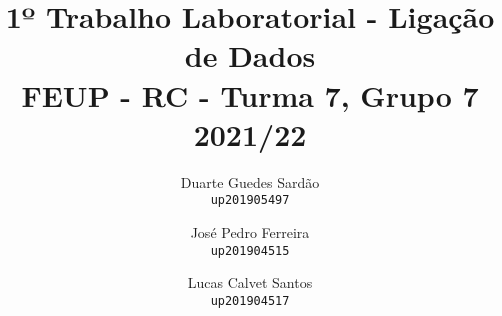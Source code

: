 \author{
  Duarte Guedes Sardão\\
  \texttt{up201905497}
  \and
  José Pedro Ferreira\\
  \texttt{up201904515}
  \and
  Lucas Calvet Santos\\
  \texttt{up201904517}
}
\title{1º Trabalho Laboratorial - Ligação de Dados\\\large FEUP - RC - Turma 7, Grupo 7\\\normalsize 2021/22}
\maketitle
\thispagestyle{empty}
\clearpage
\renewcommand*\contentsname{Índice}
\tableofcontents
\thispagestyle{empty}
\clearpage
\setcounter{page}{1}
